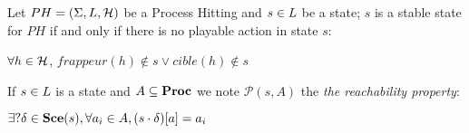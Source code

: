 \begin{definition}
\label{def:FixPoint2}
Let $PH = (\Sigma,L,\mathcal{H})$ be a Process Hitting and
$s \in L$ be a state;
$s$ is a stable state for $PH$ if and only if there is no playable action in state $s$: 
\begin{center}
$\forall h \in \mathcal{H}$, $frappeur(h) \notin s \vee cible(h) \notin s$
\end{center}
\end{definition}


\begin{definition}
\label{def:reachability}

 If $s \in L$ is a state and $A \subseteq \mathbf{Proc}$ 
 we note $\mathcal{P}(s, A)$ the \emph{the reachability property}:
 \begin{center}
  $\exists? \delta \in \mathbf{Sce}(s), \forall a_i \in A, {(s \cdot \delta)[a]}=a_i$
 \end{center}
   
\end{definition}


